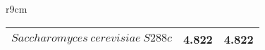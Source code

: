 \begin{wraptable}{r}{9cm}
\begin{tabular}{ @{ \makebox[2em][r]{\rownumber\space} } | lcc}
         $ Saccharomyces \ cerevisiae \ S288c $ & 4.822 & 4.822 \\ 
		\bottomrule
	\end{tabular}	
\end{wraptable}